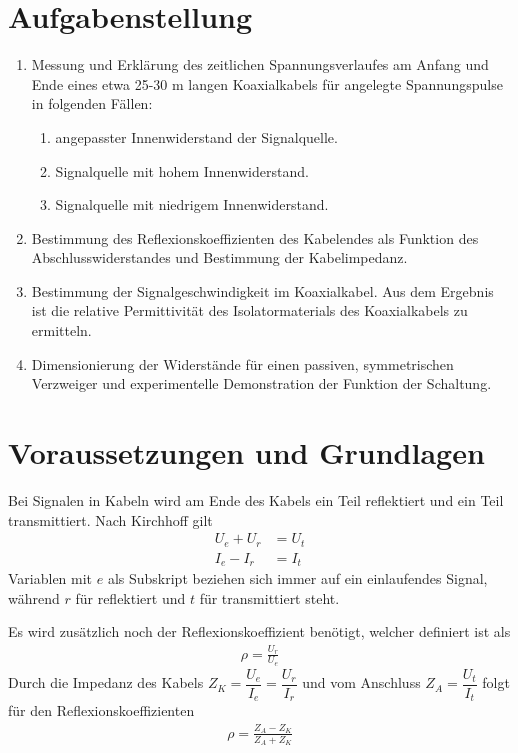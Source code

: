 \documentclass{article}
\begin{document}
\parindent0cm




\pagestyle{fancy}

\tableofcontents
\newpage
\section{Aufgabenstellung}

\begin{enumerate}
\item Messung und Erklärung des zeitlichen Spannungsverlaufes am Anfang und Ende eines etwa 25-30 m langen Koaxialkabels für angelegte Spannungspulse in folgenden Fällen:
\begin{enumerate}
\item angepasster Innenwiderstand der Signalquelle.
\item Signalquelle mit hohem Innenwiderstand.
\item Signalquelle mit niedrigem Innenwiderstand.
\end{enumerate}
\item Bestimmung des Reflexionskoeffizienten des Kabelendes als Funktion des Abschlusswiderstandes und Bestimmung der Kabelimpedanz.
\item Bestimmung der Signalgeschwindigkeit im Koaxialkabel. Aus dem Ergebnis ist die relative Permittivität des Isolatormaterials des Koaxialkabels zu ermitteln.
\item Dimensionierung der Widerstände für einen passiven, symmetrischen Verzweiger und experimentelle Demonstration der Funktion der Schaltung.
 
\end{enumerate}



\section{Voraussetzungen und Grundlagen}

Bei Signalen in Kabeln wird am Ende des Kabels ein Teil reflektiert und ein Teil transmittiert. Nach Kirchhoff gilt
\begin{align}
U_e + U_r &= U_t \\
I_e - I_r &= I_t
\end{align}
Variablen mit $e$ als Subskript beziehen sich immer auf ein einlaufendes Signal, während $r$ für reflektiert und $t$ für transmittiert steht.

Es wird zusätzlich noch der Reflexionskoeffizient benötigt, welcher definiert ist als
\begin{align}
\label{eq:reflexionskoeff1}
\rho = \frac{U_r}{U_e}
\end{align}
Durch die Impedanz des Kabels $Z_K = \dfrac{U_e}{I_e} = \dfrac{U_r}{I_r}$ und vom Anschluss $Z_A = \dfrac{U_t}{I_t}$ folgt für den Reflexionskoeffizienten
\begin{align}
\label{eq:reflexionskoeff}
\rho = \frac{Z_A-Z_K}{Z_A+Z_K}
\end{align}
\end{document}
